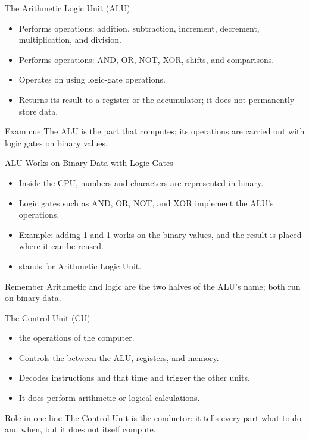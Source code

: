 \documentclass[aspectratio=169]{beamer}
\begin{document}
\begin{frame}{The Arithmetic Logic Unit (ALU)}
  \begin{itemize}
    \item Performs  operations: addition, subtraction,
      increment, decrement, multiplication, and division.
    \item Performs  operations: AND, OR, NOT, XOR, shifts, and
      comparisons.
    \item Operates on  using logic-gate operations.
    \item Returns its result to a register or the accumulator; it does not
      permanently store data.
  \end{itemize}
  \begin{alertblock}{Exam cue}
    The ALU is the part that computes; its operations are carried out with
    logic gates on binary values.
  \end{alertblock}
\end{frame}

\begin{frame}{ALU Works on Binary Data with Logic Gates}
  \begin{itemize}
    \item Inside the CPU, numbers and characters are represented in binary.
    \item Logic gates such as AND, OR, NOT, and XOR implement the ALU's
      operations.
    \item Example: adding 1 and 1 works on the binary values, and the result
      is placed where it can be reused.
    \item {} stands for Arithmetic Logic Unit.
  \end{itemize}
  \begin{block}{Remember}
    Arithmetic and logic are the two halves of the ALU's name; both run on
    binary data.
  \end{block}
\end{frame}

\begin{frame}{The Control Unit (CU)}
  \begin{itemize}
    \item {} the operations of the computer.
    \item Controls the  between the ALU, registers, and
      memory.
    \item Decodes instructions and  that time and
      trigger the other units.
    \item It does  perform arithmetic or logical calculations.
  \end{itemize}
  \begin{block}{Role in one line}
    The Control Unit is the conductor: it tells every part what to do and
    when, but it does not itself compute.
  \end{block}
\end{frame}
\end{document}
